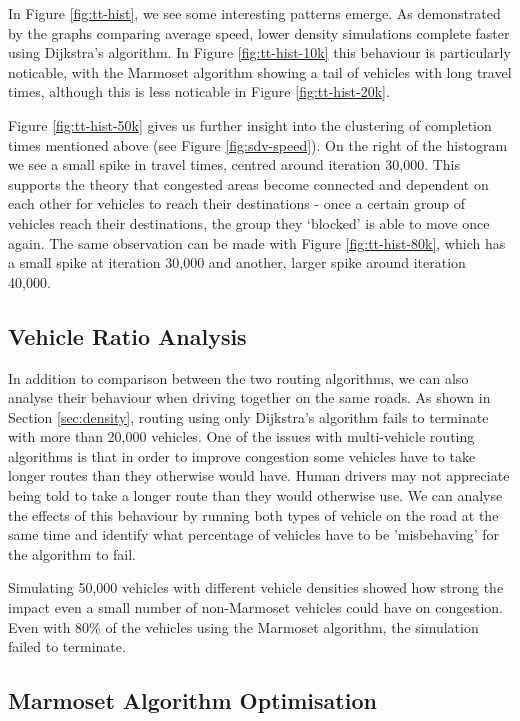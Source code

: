 \documentclass[ %
                    author={Alexander Hill},
                supervisor={Dr. Benjamin Sach},
                    degree={MEng},
                     title={MARMOSET},
                  subtitle={Multi-Agent Route Management using Online Simulation for Efficient Transportation},
                      type={research},
                      year={2016} ]{dissertation}
\begin{document}
In Figure \ref{fig:tt-hist}, we see some interesting patterns emerge. As
demonstrated by the graphs comparing average speed, lower density simulations
complete faster using Dijkstra's algorithm. In Figure \ref{fig:tt-hist-10k}
this behaviour is particularly noticable, with the Marmoset algorithm showing a
tail of vehicles with long travel times, although this is less noticable in
Figure \ref{fig:tt-hist-20k}.

Figure \ref{fig:tt-hist-50k} gives us further insight into the clustering of
completion times mentioned above (see Figure \ref{fig:sdv-speed}). On the
right of the histogram we see a small spike in travel times, centred around
iteration 30,000. This supports the theory that congested areas become
connected and dependent on each other for vehicles to reach their destinations -
once a certain group of vehicles reach their destinations, the group they
`blocked' is able to move once again. The same observation can be made with
Figure \ref{fig:tt-hist-80k}, which has a small spike at iteration 30,000 and
another, larger spike around iteration 40,000.

\subsection{Vehicle Ratio Analysis}

In addition to comparison between the two routing algorithms, we can also
analyse their behaviour when driving together on the same roads. As shown in
Section \ref{sec:density}, routing using only Dijkstra's algorithm fails to
terminate with more than 20,000 vehicles. One of the issues with multi-vehicle
routing algorithms is that in order to improve congestion some vehicles have to
take longer routes than they otherwise would have. Human drivers may not
appreciate being told to take a longer route than they would otherwise use. We
can analyse the effects of this behaviour by running both types of vehicle on
the road at the same time and identify what percentage of vehicles have to be
'misbehaving' for the algorithm to fail.

Simulating 50,000 vehicles with different vehicle densities showed how strong
the impact even a small number of non-Marmoset vehicles could have on
congestion. Even with 80\% of the vehicles using the Marmoset algorithm,
the simulation failed to terminate.

\subsection{Marmoset Algorithm Optimisation}
\end{document}
